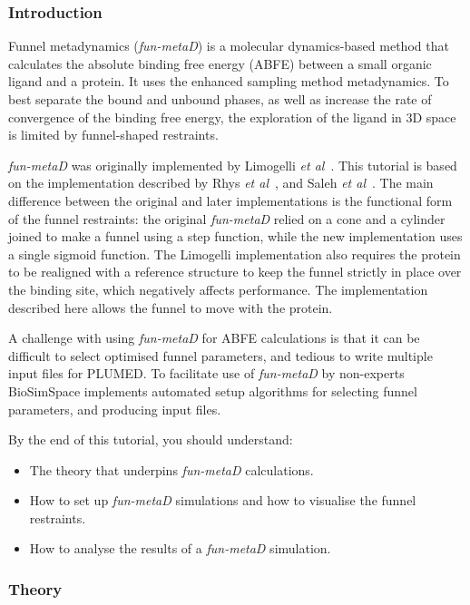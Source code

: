 \hypertarget{funnel-metadynamics-tutorial}{%
\label{funnel-metadynamics-tutorial}}
\hypertarget{Introduction}{%
\subsubsection{Introduction}\label{Introduction}}

Funnel metadynamics (\emph{fun-metaD}) is a molecular dynamics-based method that calculates the absolute binding free energy (ABFE) between a small organic ligand and a protein. It uses the enhanced sampling method metadynamics. To best separate the bound
and unbound phases, as well as increase the rate of convergence of the binding free energy, the exploration of the ligand in 3D space is limited by funnel-shaped
restraints.

\emph{fun-metaD} was originally implemented by Limogelli \emph{et al}~\cite{Limongelli2013}. This tutorial is based on the implementation described by Rhys \emph{et al}~\cite{Evans2020}, and Saleh \emph{et al}~\cite{Saleh2017}. The main difference between the original and later implementations is the functional form of the funnel restraints: the original \emph{fun-metaD} relied on a cone and a cylinder joined to make a funnel using a step function, while the new implementation uses a single
sigmoid function. The Limogelli implementation also requires the protein to be realigned with a reference structure to keep the funnel strictly in place over the binding site, which negatively affects performance. The implementation described here allows the funnel to move with the protein.

A challenge with using \emph{fun-metaD} for ABFE calculations is that it can be difficult to select optimised funnel parameters, and tedious to write multiple input files for PLUMED. To facilitate use of \emph{fun-metaD} by non-experts  BioSimSpace implements automated setup algorithms for selecting funnel parameters, and producing input files. 

By the end of this tutorial, you should understand:
\begin{itemize}
\item The theory that underpins \emph{fun-metaD} calculations.
\item How to set up \emph{fun-metaD} simulations and how to
visualise the funnel restraints.
\item How to analyse the results of a \emph{fun-metaD} simulation.
\end{itemize}

\hypertarget{the-theory}{%
\subsubsection{Theory}\label{the-theory}}

